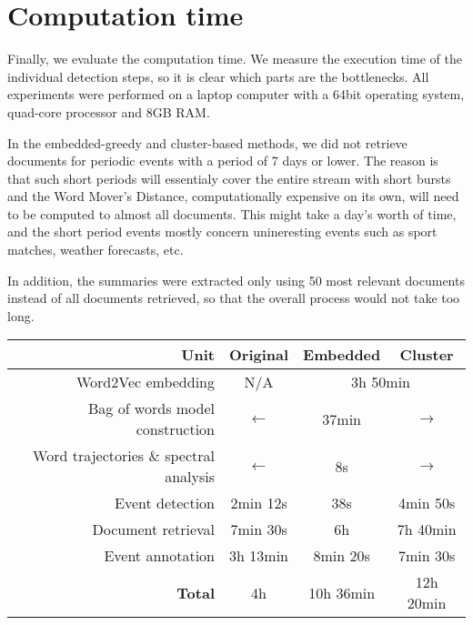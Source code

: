 \section{Computation time}

Finally, we evaluate the computation time. We measure the execution time of the individual detection steps, so it is clear which parts are the bottlenecks. All experiments were performed on a laptop computer with a 64bit operating system, quad-core processor and 8GB RAM.

In the embedded-greedy and cluster-based methods, we did not retrieve documents for periodic events with a period of 7 days or lower. The reason is that such short periods will essentialy cover the entire stream with short bursts and the Word Mover's Distance, computationally expensive on its own, will need to be computed to almost all documents. This might take a day's worth of time, and the short period events mostly concern unineresting events such as sport matches, weather forecasts, etc.

In addition, the summaries were extracted only using 50 most relevant documents instead of all documents retrieved, so that the overall process would not take too long.

\hspace{\fill}

\begin{minipage}{\linewidth}
\centering
\begin{tabular}{ r c c c }\toprule[1.5pt]
\bf Unit & \bf Original & \bf Embedded & \bf Cluster \\ \midrule
Word2Vec embedding & N/A & \multicolumn{2}{c}{3h 50min} \\
Bag of words model construction & $\longleftarrow$ & 37min & $\longrightarrow$ \\
Word trajectories \& spectral analysis & $\longleftarrow$ & 8s & $\longrightarrow$ \\
Event detection & 2min 12s & 38s & 4min 50s \\
Document retrieval & 7min 30s & 6h & 7h 40min \\
Event annotation & 3h 13min & 8min 20s & 7min 30s \\ \midrule
\bf Total & 4h & 10h 36min & 12h 20min\\ \bottomrule[1.25pt]

\end{tabular}\par
{} \label{tab:title}
\end{minipage}


